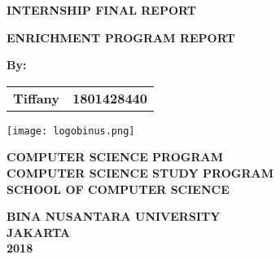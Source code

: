 \begin{titlepage}
\renewcommand{\baselinestretch}{1.5}\normalsize
    \begin{center}
        \textbf{INTERNSHIP FINAL REPORT}
        
        \vspace{1.5cm}
        \textbf{ENRICHMENT PROGRAM REPORT}
        
        \vspace{1.5cm}
        \textbf{By:}
        
        \begin{tabular}{ll}
        \textbf{Tiffany} & \textbf{1801428440}
        \end{tabular}
         
        \vfill
        
        \texttt{[image: logobinus.png]}
        
        \vspace{4cm}
        \textbf{COMPUTER SCIENCE PROGRAM}\\
        \textbf{COMPUTER SCIENCE STUDY PROGRAM}\\
        \textbf{SCHOOL OF COMPUTER SCIENCE}	
        
		\vspace{1.5cm}        
        
        \textbf{BINA NUSANTARA UNIVERSITY}\\
        \textbf{JAKARTA}\\
        \textbf{2018}
    \end{center}
\end{titlepage}